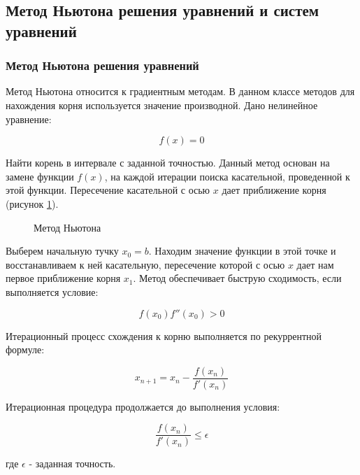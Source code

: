 \subsection{Метод Ньютона решения уравнений и систем уравнений}
\subsubsection{Метод Ньютона решения уравнений}

Метод Ньютона относится к градиентным методам. В данном классе методов для нахождения корня используется значение производной.
Дано нелинейное уравнение:
\begin{center}
\begin{equation}
	\label{eq:newton_base}
	f(x) = 0
\end{equation}
\end{center}

Найти корень в интервале   с заданной точностью.
Данный метод основан на замене функции ${f(x)}$, на каждой итерации поиска касательной, проведенной к этой функции. Пересечение касательной с осью ${x}$
дает приближение корня (рисунок \ref{pic:newton_method}).
 
\begin{figure}[H]
	\center{}
	\caption{Метод Ньютона}
	\label{pic:newton_method}
\end{figure}

Выберем начальную тучку ${x_0=b}$. Находим значение функции в этой точке и восстанавливаем к ней касательную, пересечение которой с осью ${x}$
дает нам первое приближение корня ${x_1}$.  Метод обеспечивает быструю сходимость, если выполняется условие:
\begin{center}
\begin{equation}
	\label{eq:newton_base_1}
	f(x_0)f''(x_0) > 0
\end{equation}
\end{center}

Итерационный процесс схождения к корню выполняется по рекуррентной формуле:
\begin{center}
\begin{equation}
	\label{eq:newton_eq}
	x_{n+1} = x_n - \frac{f(x_n)}{f'(x_n)}
\end{equation}
\end{center}

Итерационная процедура продолжается до выполнения условия:
\begin{center}
\begin{equation}
	\label{eq:newton_eq_bound}
	\frac{f(x_n)}{f'(x_n)} \leq \epsilon
\end{equation}
\end{center}
где ${\epsilon}$ - заданная точность.

